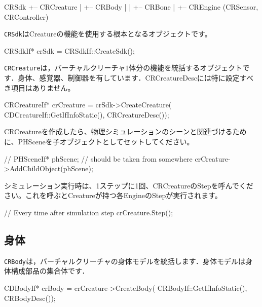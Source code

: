 \begin{sourcecode}
CRSdk
+-- CRCreature
|   +-- CRBody
|   |   +-- CRBone
|   +-- CREngine (CRSensor, CRController)
\end{sourcecode}

\texttt{CRSdk}\KLUDGE はCreature\KLUDGE の機能を使用する根本となるオブジェクトです。
\begin{sourcecode}
CRSdkIf* crSdk = CRSdkIf::CreateSdk();
\end{sourcecode}

\texttt{CRCreature}\KLUDGE は，バーチャルクリーチャ$1$\KLUDGE 体分の機能を統括するオブジェクトです．身体、感覚器、制御器を有しています．CRCreatureDesc\KLUDGE には特に設定すべき項目はありません。
\begin{sourcecode}
CRCreatureIf* crCreature = crSdk->CreateCreature(
  CDCreatureIf::GetIfInfoStatic(), CRCreatureDesc());
\end{sourcecode}
CRCreature\KLUDGE を作成したら、物理シミュレーションのシーンと関連づけるために、PHScene\KLUDGE を子オブジェクトとしてセットしてください。
\begin{sourcecode}
// PHSceneIf* phScene;   // should be taken from somewhere
crCreature->AddChildObject(phScene);
\end{sourcecode}

\KLUDGE シミュレーション実行時は、1\KLUDGE ステップに1\KLUDGE 回、CRCreature\KLUDGE のStep\KLUDGE を呼んでください。これを呼ぶとCreature\KLUDGE が持つ各Engine\KLUDGE のStep\KLUDGE が実行されます。
\begin{sourcecode}
// Every time after simulation step
crCreature.Step();
\end{sourcecode}



\subsection{\KLUDGE 身体}

\texttt{CRBody}\KLUDGE は，バーチャルクリーチャの身体モデルを統括します．身体モデルは身体構成部品の集合体です．
\begin{sourcecode}
CDBodyIf* crBody = crCreature->CreateBody(
  CRBodyIf::GetIfInfoStatic(), CRBodyDesc());
\end{sourcecode}

